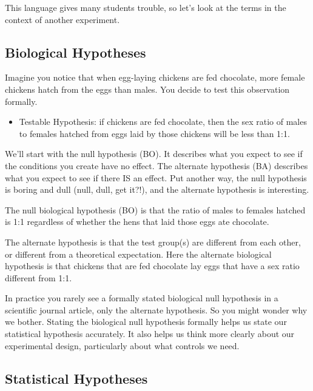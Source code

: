 \documentclass[
]{book}
\providecommand{\tightlist}{%
  \setlength{\itemsep}{0pt}\setlength{\parskip}{0pt}}
\begin{document}
This language gives many students trouble, so let's look at the terms in the context of another experiment.

\hypertarget{biological-hypotheses}{%
\subsection{Biological Hypotheses}\label{biological-hypotheses}}

Imagine you notice that when egg-laying chickens are fed chocolate, more female chickens hatch from the eggs than males. You decide to test this observation formally.

\begin{itemize}
\tightlist
\item
  Testable Hypothesis: if chickens are fed chocolate, then the sex ratio of males to females hatched from eggs laid by those chickens will be less than 1:1.
\end{itemize}

We'll start with the null hypothesis (BO). It describes what you expect to see if the conditions you create have no effect. The alternate hypothesis (BA) describes what you expect to see if there IS an effect. Put another way, the null hypothesis is boring and dull (null, dull, get it?!), and the alternate hypothesis is interesting.

The null biological hypothesis (BO) is that the ratio of males to females hatched is 1:1 regardless of whether the hens that laid those eggs ate chocolate.

The alternate hypothesis is that the test group(s) are different from each other, or different from a theoretical expectation. Here the alternate biological hypothesis is that chickens that are fed chocolate lay eggs that have a sex ratio different from 1:1.

In practice you rarely see a formally stated biological null hypothesis in a scientific journal article, only the alternate hypothesis. So you might wonder why we bother. Stating the biological null hypothesis formally helps us state our statistical hypothesis accurately. It also helps us think more clearly about our experimental design, particularly about what controls we need.

\hypertarget{statistical-hypotheses}{%
\subsection{Statistical Hypotheses}\label{statistical-hypotheses}}
\end{document}

